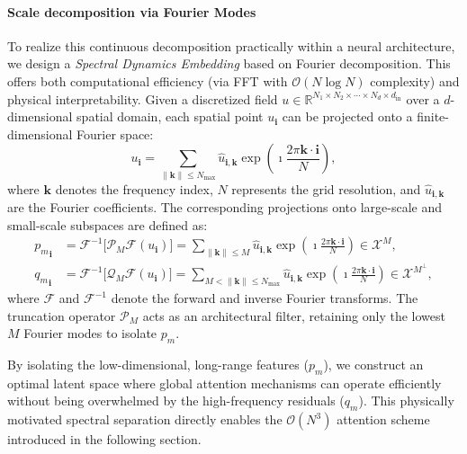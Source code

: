\documentclass[final,3p,times]{elsarticle}
\begin{document}
\paragraph{Scale decomposition via Fourier Modes}
To realize this continuous decomposition practically within a neural architecture, we design a \emph{Spectral Dynamics Embedding} based on Fourier decomposition. This offers both computational efficiency (via FFT with $\mathcal{O}(N \log N)$ complexity) and physical interpretability. Given a discretized field $u \in \mathbb{R}^{N_1 \times N_2 \times \cdots \times N_d \times d_{\text{in}}}$ over a $d$-dimensional spatial domain, each spatial point $u_{\mathbf{i}}$ can be projected onto a finite-dimensional Fourier space:
\begin{equation}
u_{\mathbf{i}} = \sum_{\|\mathbf{k}\| \leq N_{\max}} \hat{u}_{\mathbf{i},\mathbf{k}} \exp\left(\imath \frac{2\pi \mathbf{k} \cdot \mathbf{i}}{N}\right),
\label{eq:fourier_expansion}
\end{equation}
where $\mathbf{k}$ denotes the frequency index, $N$ represents the grid resolution, and $\hat{u}_{\mathbf{i},\mathbf{k}}$ are the Fourier coefficients.
The corresponding projections onto large-scale and small-scale subspaces are defined as:
\begin{align}
{p_m}_{\mathbf{i}} &= \mathcal{F}^{-1}\big[\mathscr{P}_M \mathcal{F}(u_{\mathbf{i}})\big] = \sum_{\|\mathbf{k}\| \leq M} \hat{u}_{\mathbf{i},\mathbf{k}} \exp\left(\imath \frac{2\pi \mathbf{k} \cdot \mathbf{i}}{N}\right) \in \mathscr{X}^{M}, \label{eq:large_scale_projection} \\
{q_m}_{\mathbf{i}} &= \mathcal{F}^{-1}\big[\mathscr{Q}_M \mathcal{F}(u_{\mathbf{i}})\big] = \sum_{M < \|\mathbf{k}\| \leq N_{\max}} \hat{u}_{\mathbf{i},\mathbf{k}} \exp\left(\imath \frac{2\pi \mathbf{k} \cdot \mathbf{i}}{N}\right) \in \mathscr{X}^{M^\perp}, \label{eq:small_scale_projection}
\end{align}
where $\mathcal{F}$ and $\mathcal{F}^{-1}$ denote the forward and inverse Fourier transforms. The truncation operator $\mathscr{P}_M$ acts as an architectural filter, retaining only the lowest $M$ Fourier modes to isolate $p_m$. 

By isolating the low-dimensional, long-range features ($p_m$), we construct an optimal latent space where global attention mechanisms can operate efficiently without being overwhelmed by the high-frequency residuals ($q_m$). This physically motivated spectral separation directly enables the $\mathcal{O}(N^3)$ attention scheme introduced in the following section.
\end{document}

